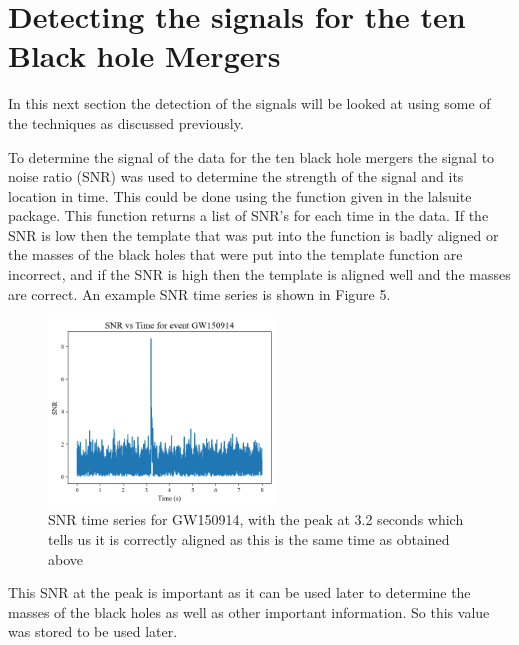 \documentclass{article}
\begin{document}
\section*{Detecting the signals for the ten Black hole Mergers}
In this next section the detection of the signals will be looked at using some of the
techniques as discussed previously.

To determine the signal of the data for the ten black hole mergers the signal
to noise ratio (SNR) was used to determine the strength of the signal and its location in time.
This could be done using the function given in the lalsuite package. This function
returns a list of SNR's for each time in the data. If the SNR is low then the
template that was put into the function is badly aligned or the masses of the black holes
that were put into the template function are incorrect, and if the SNR is high
then the template is aligned well and the masses are correct. An example SNR time series
is shown in Figure 5.
\begin{figure}[h]
    \includegraphics[width=6cm]{images/SNR_gw150914.png}
    \caption{SNR time series for GW150914, with the peak at 3.2 seconds which tells
    us it is correctly aligned as this is the same time as obtained above}
    \label{fig:SNR}
\end{figure}
This SNR at the peak is important as it can be used later to determine the masses of the
black holes as well as other important information. So this value was stored to be used later.
\end{document}

